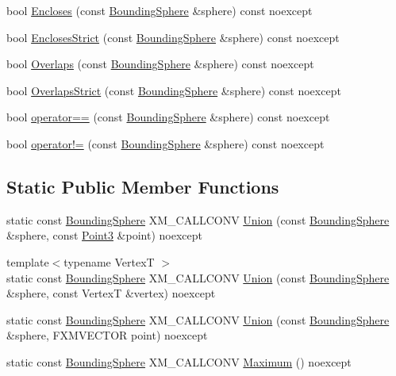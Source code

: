 \begin{DoxyCompactItemize}
bool \mbox{\hyperlink{classmage_1_1_bounding_sphere_ac5989739e15d3525bbb805f9c457ad4d}{Encloses}} (const \mbox{\hyperlink{classmage_1_1_bounding_sphere}{Bounding\+Sphere}} \&sphere) const noexcept
\item 
bool \mbox{\hyperlink{classmage_1_1_bounding_sphere_a8f0fc134762fb9a00b47d62cc09c7703}{Encloses\+Strict}} (const \mbox{\hyperlink{classmage_1_1_bounding_sphere}{Bounding\+Sphere}} \&sphere) const noexcept
\item 
bool \mbox{\hyperlink{classmage_1_1_bounding_sphere_aec1440ef7a88b85ae6a310a41b5b7f20}{Overlaps}} (const \mbox{\hyperlink{classmage_1_1_bounding_sphere}{Bounding\+Sphere}} \&sphere) const noexcept
\item 
bool \mbox{\hyperlink{classmage_1_1_bounding_sphere_a352314bd02664521a516ac5d0ce4a5a4}{Overlaps\+Strict}} (const \mbox{\hyperlink{classmage_1_1_bounding_sphere}{Bounding\+Sphere}} \&sphere) const noexcept
\item 
bool \mbox{\hyperlink{classmage_1_1_bounding_sphere_adc183c59a09a071fbc78b833cc66f218}{operator==}} (const \mbox{\hyperlink{classmage_1_1_bounding_sphere}{Bounding\+Sphere}} \&sphere) const noexcept
\item 
bool \mbox{\hyperlink{classmage_1_1_bounding_sphere_a841979aaee8a82784674296801aa5fbc}{operator!=}} (const \mbox{\hyperlink{classmage_1_1_bounding_sphere}{Bounding\+Sphere}} \&sphere) const noexcept
\end{DoxyCompactItemize}
\subsection*{Static Public Member Functions}
\begin{DoxyCompactItemize}
\item 
static const \mbox{\hyperlink{classmage_1_1_bounding_sphere}{Bounding\+Sphere}} X\+M\+\_\+\+C\+A\+L\+L\+C\+O\+NV \mbox{\hyperlink{classmage_1_1_bounding_sphere_a519f2f7bf6439ea384d5da60557223bf}{Union}} (const \mbox{\hyperlink{classmage_1_1_bounding_sphere}{Bounding\+Sphere}} \&sphere, const \mbox{\hyperlink{structmage_1_1_point3}{Point3}} \&point) noexcept
\item 
{\footnotesize template$<$typename VertexT $>$ }\\static const \mbox{\hyperlink{classmage_1_1_bounding_sphere}{Bounding\+Sphere}} X\+M\+\_\+\+C\+A\+L\+L\+C\+O\+NV \mbox{\hyperlink{classmage_1_1_bounding_sphere_a14660f9e7b33be68fabae6d4036b4d8b}{Union}} (const \mbox{\hyperlink{classmage_1_1_bounding_sphere}{Bounding\+Sphere}} \&sphere, const VertexT \&vertex) noexcept
\item 
static const \mbox{\hyperlink{classmage_1_1_bounding_sphere}{Bounding\+Sphere}} X\+M\+\_\+\+C\+A\+L\+L\+C\+O\+NV \mbox{\hyperlink{classmage_1_1_bounding_sphere_af9398725d5a70f47acedfb276f5060c5}{Union}} (const \mbox{\hyperlink{classmage_1_1_bounding_sphere}{Bounding\+Sphere}} \&sphere, F\+X\+M\+V\+E\+C\+T\+OR point) noexcept
\item 
static const \mbox{\hyperlink{classmage_1_1_bounding_sphere}{Bounding\+Sphere}} X\+M\+\_\+\+C\+A\+L\+L\+C\+O\+NV \mbox{\hyperlink{classmage_1_1_bounding_sphere_afbdb210289e14ceeb69d62d1d0585b93}{Maximum}} () noexcept
\end{DoxyCompactItemize}
